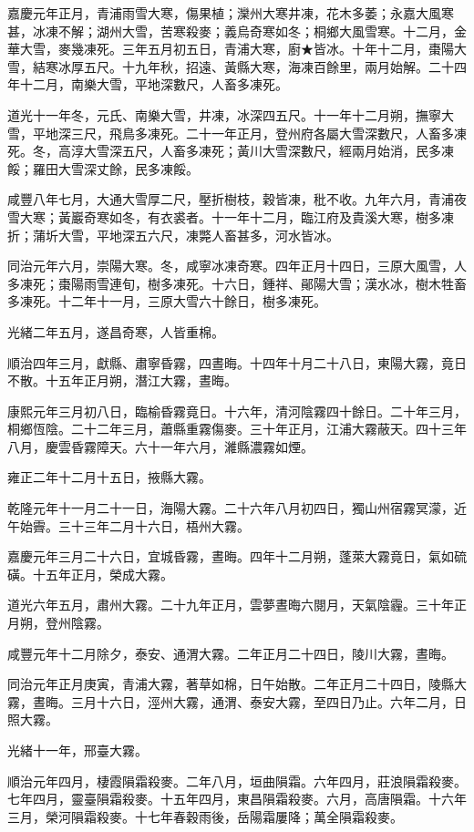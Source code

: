 \begin{pinyinscope}
嘉慶元年正月，青浦雨雪大寒，傷果植；灤州大寒井凍，花木多萎；永嘉大風寒甚，冰凍不解；湖州大雪，苦寒殺麥；義烏奇寒如冬；桐鄉大風雪寒。十二月，金華大雪，麥幾凍死。三年五月初五日，青浦大寒，廚★皆冰。十年十二月，棗陽大雪，結寒冰厚五尺。十九年秋，招遠、黃縣大寒，海凍百餘里，兩月始解。二十四年十二月，南樂大雪，平地深數尺，人畜多凍死。

道光十一年冬，元氏、南樂大雪，井凍，冰深四五尺。十一年十二月朔，撫寧大雪，平地深三尺，飛鳥多凍死。二十一年正月，登州府各屬大雪深數尺，人畜多凍死。冬，高淳大雪深五尺，人畜多凍死；黃川大雪深數尺，經兩月始消，民多凍餒；羅田大雪深丈餘，民多凍餒。

咸豐八年七月，大通大雪厚二尺，壓折樹枝，穀皆凍，秕不收。九年六月，青浦夜雪大寒；黃巖奇寒如冬，有衣裘者。十一年十二月，臨江府及貴溪大寒，樹多凍折；蒲圻大雪，平地深五六尺，凍斃人畜甚多，河水皆冰。

同治元年六月，崇陽大寒。冬，咸寧冰凍奇寒。四年正月十四日，三原大風雪，人多凍死；棗陽雨雪連旬，樹多凍死。十六日，鍾祥、鄖陽大雪；漢水冰，樹木牲畜多凍死。十二年十一月，三原大雪六十餘日，樹多凍死。

光緒二年五月，遂昌奇寒，人皆重棉。

順治四年三月，獻縣、肅寧昏霧，四晝晦。十四年十月二十八日，東陽大霧，竟日不散。十五年正月朔，潛江大霧，晝晦。

康熙元年三月初八日，臨榆昏霧竟日。十六年，清河陰霧四十餘日。二十年三月，桐鄉恆陰。二十二年三月，蕭縣重霧傷麥。三十年正月，江浦大霧蔽天。四十三年八月，慶雲昏霧障天。六十一年六月，濰縣濃霧如煙。

雍正二年十二月十五日，掖縣大霧。

乾隆元年十一月二十一日，海陽大霧。二十六年八月初四日，獨山州宿霧冥濛，近午始霽。三十三年二月十六日，梧州大霧。

嘉慶元年三月二十六日，宜城昏霧，晝晦。四年十二月朔，蓬萊大霧竟日，氣如硫磺。十五年正月，榮成大霧。

道光六年五月，肅州大霧。二十九年正月，雲夢晝晦六閱月，天氣陰霾。三十年正月朔，登州陰霧。

咸豐元年十二月除夕，泰安、通渭大霧。二年正月二十四日，陵川大霧，晝晦。

同治元年正月庚寅，青浦大霧，著草如棉，日午始散。二年正月二十四日，陵縣大霧，晝晦。三月十六日，涇州大霧，通渭、泰安大霧，至四日乃止。六年二月，日照大霧。

光緒十一年，邢臺大霧。

順治元年四月，棲霞隕霜殺麥。二年八月，垣曲隕霜。六年四月，莊浪隕霜殺麥。七年四月，靈臺隕霜殺麥。十五年四月，東昌隕霜殺麥。六月，高唐隕霜。十六年三月，榮河隕霜殺麥。十七年春穀雨後，岳陽霜屢降；萬全隕霜殺麥。


\end{pinyinscope}
